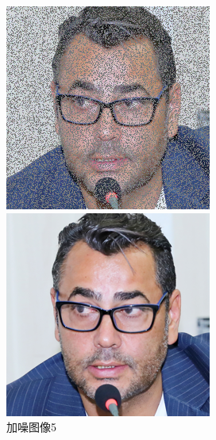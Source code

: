 \begin{figure}[H]
  \centering
  \begin{minipage}[b]{0.3\linewidth}
\includegraphics[width=\linewidth]{Picture/input/00005.png}
    \caption{加噪图像5}
    \label{noised image }
  \end{minipage}
  \hspace{0.1cm} %
   \begin{minipage}[b]{0.3\linewidth}
    \includegraphics[width=\linewidth]{Picture/label/00005.png}

\end{minipage}
\end{figure}

